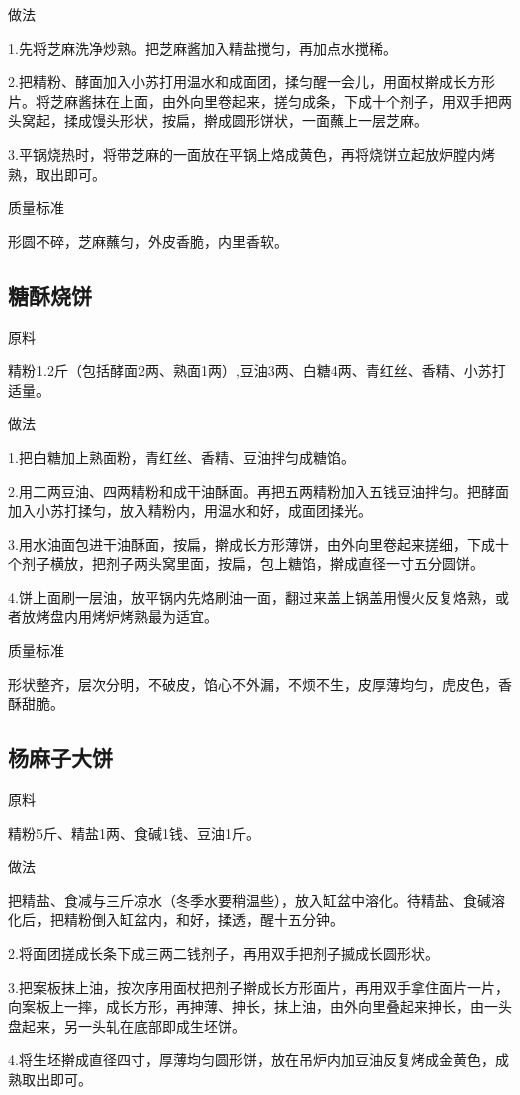 \documentclass{ctexbook}
\begin{document}
做法

1.先将芝麻洗净炒熟。把芝麻酱加入精盐搅匀，再加点水搅稀。

2.把精粉、酵面加入小苏打用温水和成面团，揉匀醒一会儿，用面杖擀成长方形片。将芝麻酱抹在上面，由外向里卷起来，搓匀成条，下成十个剂子，用双手把两头窝起，揉成馒头形状，按扁，擀成圆形饼状，一面蘸上一层芝麻。

3.平锅烧热时，将带芝麻的一面放在平锅上烙成黄色，再将烧饼立起放炉膛内烤熟，取出即可。

质量标准

形圆不碎，芝麻蘸匀，外皮香脆，内里香软。
\subsection{糖酥烧饼}
原料

精粉1.2斤（包括酵面2两、熟面1两）,豆油3两、白糖4两、青红丝、香精、小苏打适量。

做法

1.把白糖加上熟面粉，青红丝、香精、豆油拌匀成糖馅。

2.用二两豆油、四两精粉和成干油酥面。再把五两精粉加入五钱豆油拌匀。把酵面加入小苏打揉匀，放入精粉内，用温水和好，成面团揉光。

3.用水油面包进干油酥面，按扁，擀成长方形薄饼，由外向里卷起来搓细，下成十个剂子横放，把剂子两头窝里面，按扁，包上糖馅，擀成直径一寸五分圆饼。

4.饼上面刷一层油，放平锅内先烙刷油一面，翻过来盖上锅盖用慢火反复烙熟，或者放烤盘内用烤炉烤熟最为适宜。

质量标准

形状整齐，层次分明，不破皮，馅心不外漏，不烦不生，皮厚薄均匀，虎皮色，香酥甜脆。
\subsection{杨麻子大饼}
原料

精粉5斤、精盐1两、食碱1钱、豆油1斤。

做法

把精盐、食减与三斤凉水（冬季水要稍温些），放入缸盆中溶化。待精盐、食碱溶化后，把精粉倒入缸盆内，和好，揉透，醒十五分钟。

2.将面团搓成长条下成三两二钱剂子，再用双手把剂子揻成长圆形状。

3.把案板抹上油，按次序用面杖把剂子擀成长方形面片，再用双手拿住面片一片，向案板上一摔，成长方形，再抻薄、抻长，抹上油，由外向里叠起来抻长，由一头盘起来，另一头轧在底部即成生坯饼。

4.将生坯擀成直径四寸，厚薄均匀圆形饼，放在吊炉内加豆油反复烤成金黄色，成熟取出即可。
\end{document}
